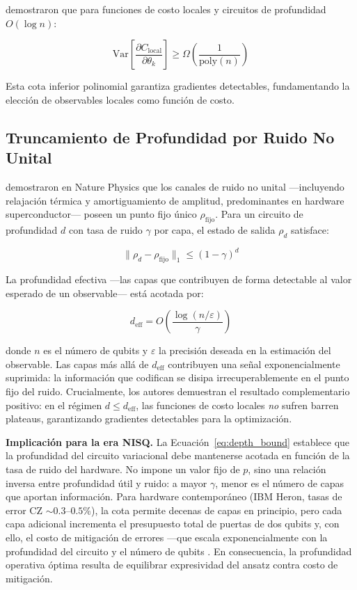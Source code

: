 \documentclass[11pt,a4paper,spanish]{book}
\begin{document}
\citet{cerezo2021} demostraron que para funciones de costo locales y circuitos de profundidad $O(\log n)$:

\begin{equation}
\text{Var}\left[\frac{\partial C_{\text{local}}}{\partial \theta_k}\right] \geq \Omega\left(\frac{1}{\text{poly}(n)}\right)
\label{eq:local_bp}
\end{equation}

\noindent Esta cota inferior polinomial garantiza gradientes detectables, fundamentando la elección de observables locales como función de costo.

\subsection{Truncamiento de Profundidad por Ruido No Unital}

\citet{mele2026} demostraron en Nature Physics que los canales de ruido no unital ---incluyendo relajación térmica y amortiguamiento de amplitud, predominantes en hardware superconductor--- poseen un punto fijo único $\rho_{\text{fijo}}$. Para un circuito de profundidad $d$ con tasa de ruido $\gamma$ por capa, el estado de salida $\rho_d$ satisface:

\begin{equation}
\|\rho_d - \rho_{\text{fijo}}\|_1 \leq (1 - \gamma)^d
\label{eq:truncation}
\end{equation}

\noindent La profundidad efectiva ---las capas que contribuyen de forma detectable al valor esperado de un observable--- está acotada por:

\begin{equation}
d_{\text{eff}} = O\!\left(\frac{\log(n/\varepsilon)}{\gamma}\right)
\label{eq:depth_bound}
\end{equation}

\noindent donde $n$ es el número de qubits y $\varepsilon$ la precisión deseada en la estimación del observable. Las capas más allá de $d_{\text{eff}}$ contribuyen una señal exponencialmente suprimida: la información que codifican se disipa irrecuperablemente en el punto fijo del ruido. Crucialmente, los autores demuestran el resultado complementario positivo: en el régimen $d \leq d_{\text{eff}}$, las funciones de costo locales \emph{no} sufren barren plateaus, garantizando gradientes detectables para la optimización.

\textbf{Implicación para la era NISQ.} La Ecuación~\ref{eq:depth_bound} establece que la profundidad del circuito variacional debe mantenerse acotada en función de la tasa de ruido del hardware. No impone un valor fijo de $p$, sino una relación inversa entre profundidad útil y ruido: a mayor $\gamma$, menor es el número de capas que aportan información. Para hardware contemporáneo (IBM Heron, tasas de error CZ $\sim 0.3$--$0.5\%$), la cota permite decenas de capas en principio, pero cada capa adicional incrementa el presupuesto total de puertas de dos qubits y, con ello, el costo de mitigación de errores ---que escala exponencialmente con la profundidad del circuito y el número de qubits \citep{tsubouchi2023}. En consecuencia, la profundidad operativa óptima resulta de equilibrar expresividad del ansatz contra costo de mitigación.
\end{document}
